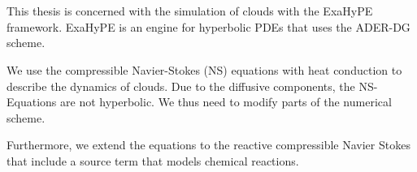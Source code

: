 \chapter{\abstractname}
This thesis is concerned with the simulation of clouds with the ExaHyPE framework.
ExaHyPE is an engine for hyperbolic PDEs that uses the ADER-DG scheme.

We use the compressible Navier-Stokes (NS) equations with heat conduction to describe the dynamics of clouds.
Due to the diffusive components, the NS-Equations are not hyperbolic.
We thus need to modify parts of the numerical scheme.

Furthermore, we extend the equations to the reactive compressible Navier Stokes that include a source term that models chemical reactions.

